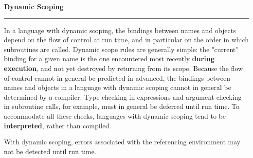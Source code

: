 \nopagenumbers
{\bf Dynamic Scoping}
\vskip 1mm
\hrule

\vskip 6pt
In a language with dynamic scoping, the bindings between names and objects depend on the flow of control at run time, and in particular on the order in which subroutines are called. Dynamic scope rules are generally simple: the "current" binding for a given name is the one encountered most recently {\bf during execution}, and not yet destroyed by returning from its scope. Because the flow of control cannot in general be predicted in advanced, the bindings between names and objects in a language with dynamic scoping cannot in general be determined by a compiler. Type checking in expressions and argument checking in subroutine calls, for example, must in general be deferred until run time. To accommodate all these checks, languages with dynamic scoping tend to be {\bf interpreted}, rather than compiled.

\vskip 6pt
With dynamic scoping, errors associated with the referencing environment may not be detected until run time.

\vfill\eject
\bye
